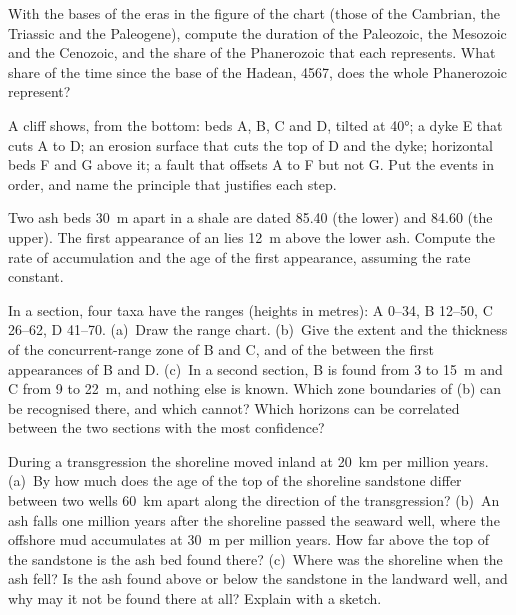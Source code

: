 \begin{exercise}[$\star$]\label{exo:b1:stratigraphic-scale:2}
With the bases of the eras in the figure of the chart (those of the Cambrian,
the Triassic and the Paleogene), compute the duration of
the Paleozoic, the Mesozoic and the Cenozoic, and the share of the Phanerozoic
that each represents. What share of the time since the base of the Hadean,
\qty{4567}{\Ma}, does the whole Phanerozoic represent?
\end{exercise}

\begin{exercise}[$\star$]\label{exo:b1:stratigraphic-scale:3}
A cliff shows, from the bottom: beds A, B, C and D, tilted at \ang{40}; a dyke
E that cuts A to D; an erosion surface that cuts the top of D and the dyke;
horizontal beds F and G above it; a fault that offsets A to F but not G. Put the
events in order, and name the principle that justifies each step.
\end{exercise}

\begin{exercise}[$\star$]\label{exo:b1:stratigraphic-scale:4}
Two ash beds \qty{30}{m} apart in a shale are dated \qty{85.40}{\Ma} (the lower)
and \qty{84.60}{\Ma} (the upper). The first appearance of an  lies
\qty{12}{m} above the lower ash. Compute the rate of accumulation and the age of
the first appearance, assuming the rate constant.
\end{exercise}

\begin{exercise}[$\star\star$]\label{exo:b1:stratigraphic-scale:5}
In a section, four taxa have the ranges (heights in metres): A 0--34, B
12--50, C 26--62, D 41--70. (a)~Draw the range chart. (b)~Give the extent and
the thickness of the concurrent-range zone of B and C, and of the 
between the first appearances of B and D. (c)~In a second section, B is found
from 3 to 15~m and C from 9 to 22~m, and nothing else is known. Which zone
boundaries of (b) can be recognised there, and which cannot? Which horizons can
be correlated between the two sections with the most confidence?
\end{exercise}

\begin{exercise}[$\star\star$]\label{exo:b1:stratigraphic-scale:6}
During a transgression the shoreline moved inland at \qty{20}{km} per million
years. (a)~By how much does the age of the top of the shoreline sandstone differ
between two wells \qty{60}{km} apart along the direction of the transgression?
(b)~An ash falls one million years after the shoreline passed the seaward well,
where the offshore mud accumulates at \qty{30}{m} per million years. How far
above the top of the sandstone is the ash bed found there? (c)~Where was the
shoreline when the ash fell? Is the ash found above or below the sandstone in
the landward well, and why may it not be found there at all? Explain with a
sketch.
\end{exercise}

